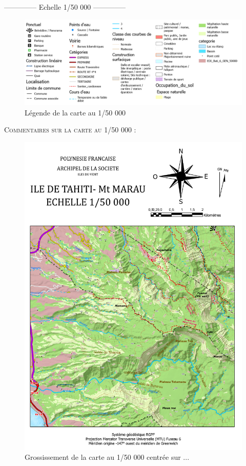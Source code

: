 \documentclass{themeensg}
\begin{document}
\begin{appendices}
\clearpage
\begin{center}
    \Large
    \colorbox{yellow!10}{--------------\- Echelle 1/50 000 --------------\-}
\end{center}

\begin{figure}[!h]
\centering
\includegraphics[width=\linewidth]{images/Annexes/Resultat/legende_50.png}
\caption{Légende de la carte au 1/50 000}
\label{15000_legende}
\end{figure}

\vspace{3cm}
\textsc{Commentaires sur la carte au 1/50 000 :}\\

\begin{figure}[!h]
\centering
\includegraphics[width=\linewidth]{images/Annexes/Resultat/Carte_50000_A4.pdf}
\caption{Grossissement de la carte au 1/50 000 centrée sur ...}
\label{15000_gros}
\end{figure}


\end{appendices}
\end{document}

